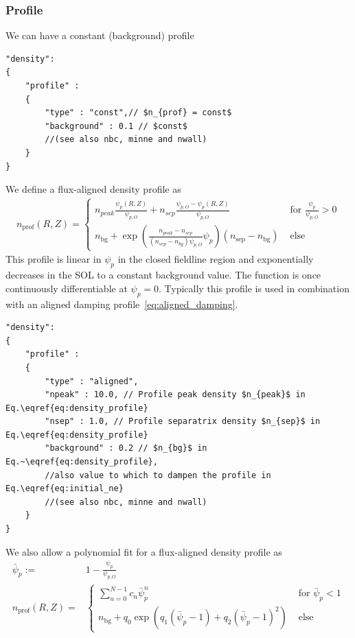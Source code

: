 \subsubsection{Profile} \label{sec:profile}
We can have a constant (background) profile
\begin{verbatim}
"density":
{
    "profile" :
    {
        "type" : "const",// $n_{prof} = const$
        "background" : 0.1 // $const$
        //(see also nbc, minne and nwall)
    }
}
\end{verbatim}
 \noindent
We define a flux-aligned density profile as
\begin{align} \label{eq:density_profile}
    n_{\text{prof}}(R,Z)= \begin{cases}
        n_{peak}\frac{\psi_p(R,Z) }{\psi_{p,O}} + n_{sep} \frac{\psi_{p,O} - \psi_p(R,Z)}{\psi_{p,O}} &\text{ for } \frac{\psi_p}{\psi_{p,O}} > 0\\
        n_{\text{bg}} + \exp\left( \frac{n_{peak} - n_{sep}}{(n_{sep}-n_{bg})\psi_{p,O}}\psi_p\right) ( n_\text{sep} - n_{\text{bg}})&\text{ else }
    \end{cases}
\end{align}
This profile is linear in $\psi_p$ in the closed fieldline region and exponentially
decreases in the SOL to a constant background value.
The function is once continuously differentiable at $\psi_p =0$.
Typically this profile is used in combination with an aligned damping profile~\eqref{eq:aligned_damping}.
\begin{verbatim}
"density":
{
    "profile" :
    {
        "type" : "aligned",
        "npeak" : 10.0, // Profile peak density $n_{peak}$ in Eq.\eqref{eq:density_profile}
        "nsep" : 1.0, // Profile separatrix density $n_{sep}$ in Eq.\eqref{eq:density_profile}
        "background" : 0.2 // $n_{bg}$ in Eq.~\eqref{eq:density_profile},
        //also value to which to dampen the profile in Eq.\eqref{eq:initial_ne}
        //(see also nbc, minne and nwall)
    }
}
\end{verbatim}
\noindent
We also allow a polynomial fit for a flux-aligned density profile as
\begin{align} \label{eq:density_profile_polynomial}
    \bar \psi_p :=& 1-\frac{\psi_p}{\psi_{p,O}} \\
    n_{\text{prof}}(R,Z)=& \begin{cases}
        \sum_{n=0}^{N-1} c_n \bar \psi_p^n &\text{ for } \bar \psi_p < 1\\
        n_{\text{bg}} + q_0\exp\left( q_1 (\bar \psi_p - 1) + q_2 (\bar \psi_p - 1)^2 \right)&\text{ else }
    \end{cases}
\end{align}
